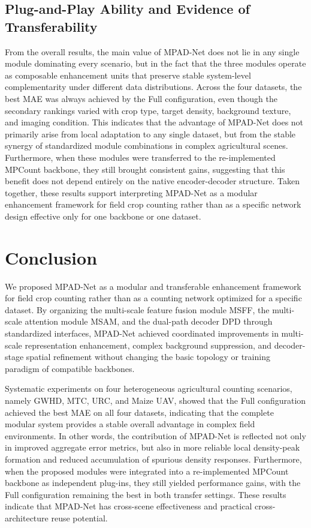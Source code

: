 \documentclass[a4paper,fleqn]{cas-sc}
\begin{document}
	\subsection{Plug-and-Play Ability and Evidence of Transferability}
	
	From the overall results, the main value of MPAD-Net does not lie in any single module dominating every scenario, but in the fact that the three modules operate as composable enhancement units that preserve stable system-level complementarity under different data distributions. Across the four datasets, the best MAE was always achieved by the Full configuration, even though the secondary rankings varied with crop type, target density, background texture, and imaging condition. This indicates that the advantage of MPAD-Net does not primarily arise from local adaptation to any single dataset, but from the stable synergy of standardized module combinations in complex agricultural scenes. Furthermore, when these modules were transferred to the re-implemented MPCount backbone, they still brought consistent gains, suggesting that this benefit does not depend entirely on the native encoder-decoder structure. Taken together, these results support interpreting MPAD-Net as a modular enhancement framework for field crop counting rather than as a specific network design effective only for one backbone or one dataset.
	
	\section{Conclusion}
	
	We proposed MPAD-Net as a modular and transferable enhancement framework for field crop counting rather than as a counting network optimized for a specific dataset. By organizing the multi-scale feature fusion module MSFF, the multi-scale attention module MSAM, and the dual-path decoder DPD through standardized interfaces, MPAD-Net achieved coordinated improvements in multi-scale representation enhancement, complex background suppression, and decoder-stage spatial refinement without changing the basic topology or training paradigm of compatible backbones.
	
	Systematic experiments on four heterogeneous agricultural counting scenarios, namely GWHD, MTC, URC, and Maize UAV, showed that the Full configuration achieved the best MAE on all four datasets, indicating that the complete modular system provides a stable overall advantage in complex field environments. In other words, the contribution of MPAD-Net is reflected not only in improved aggregate error metrics, but also in more reliable local density-peak formation and reduced accumulation of spurious density responses. Furthermore, when the proposed modules were integrated into a re-implemented MPCount backbone as independent plug-ins, they still yielded performance gains, with the Full configuration remaining the best in both transfer settings. These results indicate that MPAD-Net has cross-scene effectiveness and practical cross-architecture reuse potential.
	
\end{document}
